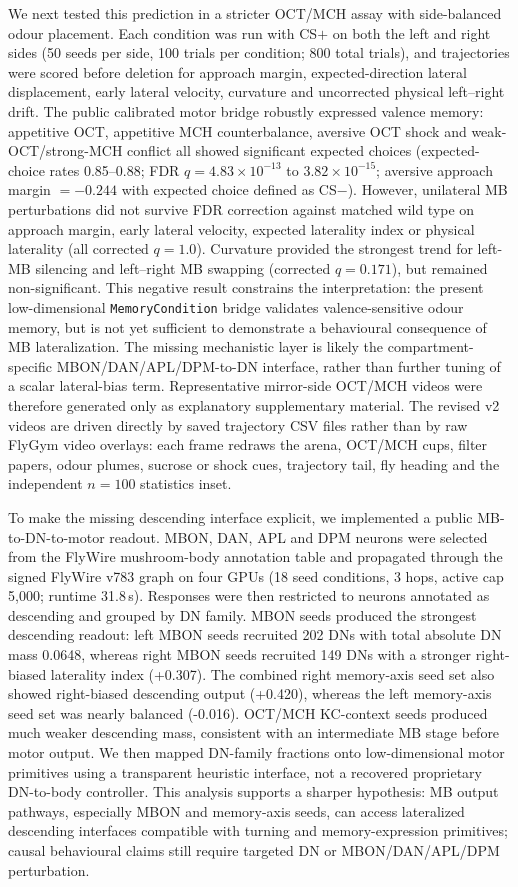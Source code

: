 \documentclass[10pt]{article}
\begin{document}
We next tested this prediction in a stricter OCT/MCH assay with side-balanced odour placement. Each condition was run with CS$+$ on both the left and right sides (50 seeds per side, 100 trials per condition; 800 total trials), and trajectories were scored before deletion for approach margin, expected-direction lateral displacement, early lateral velocity, curvature and uncorrected physical left--right drift. The public calibrated motor bridge robustly expressed valence memory: appetitive OCT, appetitive MCH counterbalance, aversive OCT shock and weak-OCT/strong-MCH conflict all showed significant expected choices (expected-choice rates 0.85--0.88; FDR $q=4.83\times10^{-13}$ to $3.82\times10^{-15}$; aversive approach margin $=-0.244$ with expected choice defined as CS$-$). However, unilateral MB perturbations did not survive FDR correction against matched wild type on approach margin, early lateral velocity, expected laterality index or physical laterality (all corrected $q=1.0$). Curvature provided the strongest trend for left-MB silencing and left--right MB swapping (corrected $q=0.171$), but remained non-significant. This negative result constrains the interpretation: the present low-dimensional \texttt{MemoryCondition} bridge validates valence-sensitive odour memory, but is not yet sufficient to demonstrate a behavioural consequence of MB lateralization. The missing mechanistic layer is likely the compartment-specific MBON/DAN/APL/DPM-to-DN interface, rather than further tuning of a scalar lateral-bias term. Representative mirror-side OCT/MCH videos were therefore generated only as explanatory supplementary material. The revised v2 videos are driven directly by saved trajectory CSV files rather than by raw FlyGym video overlays: each frame redraws the arena, OCT/MCH cups, filter papers, odour plumes, sucrose or shock cues, trajectory tail, fly heading and the independent $n=100$ statistics inset.

To make the missing descending interface explicit, we implemented a public MB-to-DN-to-motor readout. MBON, DAN, APL and DPM neurons were selected from the FlyWire mushroom-body annotation table and propagated through the signed FlyWire v783 graph on four GPUs (18 seed conditions, 3 hops, active cap 5,000; runtime 31.8\,s). Responses were then restricted to neurons annotated as descending and grouped by DN family. MBON seeds produced the strongest descending readout: left MBON seeds recruited 202 DNs with total absolute DN mass 0.0648, whereas right MBON seeds recruited 149 DNs with a stronger right-biased laterality index (+0.307). The combined right memory-axis seed set also showed right-biased descending output (+0.420), whereas the left memory-axis seed set was nearly balanced (-0.016). OCT/MCH KC-context seeds produced much weaker descending mass, consistent with an intermediate MB stage before motor output. We then mapped DN-family fractions onto low-dimensional motor primitives using a transparent heuristic interface, not a recovered proprietary DN-to-body controller. This analysis supports a sharper hypothesis: MB output pathways, especially MBON and memory-axis seeds, can access lateralized descending interfaces compatible with turning and memory-expression primitives; causal behavioural claims still require targeted DN or MBON/DAN/APL/DPM perturbation.
\end{document}
